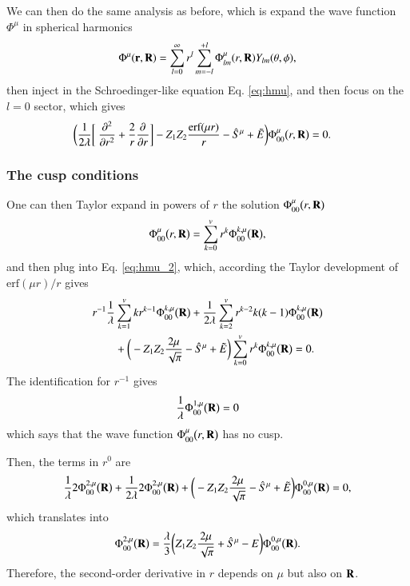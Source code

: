 \documentclass[aip,jcp,reprint,noshowkeys,superscriptaddress]{revtex4-1}
\newcommand{\deriv}[3]{\frac{\partial^{#3} #1}{\partial {#2}^{#3}}}
\newcommand{\bd}[1]{{\bf {#1}}}
\newcommand{\br}[0]{{\bf {r}}}
\begin{document}
We can then do the same analysis as before, which is expand the wave function $\Phi^{\mu}$ in spherical harmonics 
\begin{equation}
 \Phi^{\mu}(\br,\bd{R}) = \sum_{l=0}^\infty r^l \sum_{m=-l}^{+l} \Phi_{lm}^{\mu}(r,\bd{R})Y_{lm}(\theta,\phi), 
\end{equation}
then inject in the Schroedinger-like equation Eq. \eqref{eq:hmu}, and then focus on the $l=0$ sector, which gives
\begin{equation}
 \begin{aligned}
 \label{eq:hmu_2}
 \bigg( \frac{1}{2\lambda} \bigg[ \deriv{}{r}{2} + \frac{2}{r} \deriv{}{r}{}\bigg] & - Z_1 Z_2 \frac{\text{erf}(\mu r)}{r}
- \hat{S}^\mu + \tilde{E} \bigg) \Phi_{00}^{\mu}\big(r,\bd{R}\big) = 0. 
 \end{aligned}
\end{equation}


\subsubsection{The cusp conditions}
One can then Taylor expand in powers of $r$ the solution $\Phi_{00}^{\mu}\big(r,\bd{R}\big)$ 
\begin{equation}
 \Phi_{00}^{\mu}\big(r,\bd{R}\big) = \sum_{k=0}^v r^k \Phi_{00}^{k,\mu}\big(\bd{R}\big),
\end{equation}
and then plug into Eq. \eqref{eq:hmu_2}, which, according the Taylor development of $\text{erf}(\mu r)/r$ gives
\begin{equation}
 \begin{aligned}
 r^{-1} \frac{1}{\lambda} & \sum_{k=1}^v k r^{k-1} \Phi_{00}^{k,\mu}\big(\bd{R}\big) + \frac{1}{2\lambda} \sum_{k=2}^v r^{k-2} k(k-1) \Phi_{00}^{k,\mu}\big(\bd{R}\big)\\ 
& + \bigg( - Z_1 Z_2 \frac{2 \mu}{\sqrt{\pi}}  - \hat{S}^\mu + \tilde{E} \bigg)  \sum_{k=0}^v r^k \Phi_{00}^{k,\mu}\big(\bd{R}\big) = 0.
 \end{aligned}
\end{equation}
The identification for $r^{-1}$ gives
\begin{equation}
 \frac{1}{\lambda} \Phi_{00}^{1,\mu}\big(\bd{R}\big) = 0
\end{equation}
which says that the wave function $\Phi_{00}^{\mu}\big(r,\bd{R}\big)$ has no cusp. 

Then, the terms in $r^0$ are 
\begin{equation}
 \frac{1}{\lambda}2 \Phi_{00}^{2,\mu}\big(\bd{R}\big) + \frac{1}{2 \lambda} 2 \Phi_{00}^{2,\mu}\big(\bd{R}\big) 
 + \bigg( - Z_1 Z_2 \frac{2 \mu}{\sqrt{\pi}} - \hat{S}^\mu + \tilde{E}   \bigg) \Phi_{00}^{0,\mu}\big(\bd{R}\big) = 0,
\end{equation}
which translates into 
\begin{equation}
 \Phi_{00}^{2,\mu}\big(\bd{R}\big) = \frac{\lambda}{3}\bigg( Z_1 Z_2 \frac{2 \mu}{\sqrt{\pi}} + \hat{S}^\mu - E\bigg) \Phi_{00}^{0,\mu}\big(\bd{R}\big). 
\end{equation}
Therefore, the second-order derivative in $r$ depends on $\mu$ but also on $\bd{R}$. 
\end{document}
